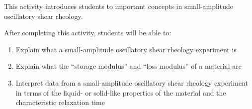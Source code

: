 %
%
%
%

\renewcommand{\figpath}{content/polymphys/mechanical-properties/SAOS/figs}
\renewcommand{\labelbase}{viscoelasticity}

\begin{activity}

\begin{instructornotes}

	This activity introduces students to important concepts in small-amplitude oscillatory shear rheology.
	
	After completing this activity, students will be able to:
			\begin{enumerate}
				\item Explain what a small-amplitude oscillatory shear rheology experiment is
				\item Explain what the ``storage modulus'' and ``loss modulus'' of a material are
				\item Interpret data from a small-amplitude oscillatory shear rheology experiment in terms of the liquid- or solid-like properties of the material and the characteristic relaxation time
			\end{enumerate}
	
			

\end{instructornotes}
\end{activity}

